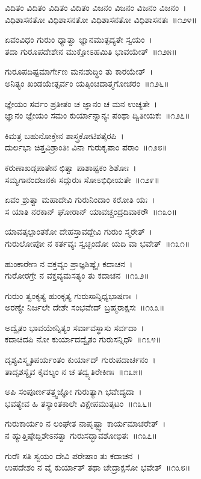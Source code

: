 ವಿದಿತಂ ವಿದಿತಂ ವಿದಿತಂ ವಿದಿತಂ ವಿಜನಂ ವಿಜನಂ ವಿಜನಂ ವಿಜನಂ~।\\
ವಿಧಿಶಾಸನತೋ ವಿಧಿಶಾಸನತೋ ವಿಧಿಶಾಸನತೋ ವಿಧಿಶಾಸನತಃ~॥೧೨೪॥

ಏವಂವಿಧಂ ಗುರುಂ ಧ್ಯಾತ್ವಾ ಜ್ಞಾನಮುತ್ಪದ್ಯತೇ ಸ್ವಯಂ~।\\
ತದಾ ಗುರೂಪದೇಶೇನ ಮುಕ್ತೋಽಹಮಿತಿ ಭಾವಯೇತ್~॥೧೨೫॥

ಗುರೂಪದಿಷ್ಟಮಾರ್ಗೇಣ ಮನಃಶುದ್ಧಿಂ ತು ಕಾರಯೇತ್~।\\
ಅನಿತ್ಯಂ ಖಂಡಯೇತ್ಸರ್ವಂ ಯತ್ಕಿಂಚಿದಾತ್ಮಗೋಚರಂ~॥೧೨೬॥

ಜ್ಞೇಯಂ ಸರ್ವಂ ಪ್ರತೀತಂ ಚ ಜ್ಞಾನಂ ಚ ಮನ ಉಚ್ಯತೇ~।\\
ಜ್ಞಾನಂ ಜ್ಞೇಯಂ ಸಮಂ ಕುರ್ಯಾನ್ನಾನ್ಯಃ ಪಂಥಾ ದ್ವಿತೀಯಕಃ~॥೧೨೭॥

ಕಿಮತ್ರ ಬಹುನೋಕ್ತೇನ ಶಾಸ್ತ್ರಕೋಟಿಶತೈರಪಿ~।\\
ದುರ್ಲಭಾ ಚಿತ್ತವಿಶ್ರಾಂತಿಃ ವಿನಾ ಗುರುಕೃಪಾಂ ಪರಾಂ~॥೧೨೮॥

ಕರುಣಾಖಡ್ಗಪಾತೇನ ಛಿತ್ವಾ ಪಾಶಾಷ್ಟಕಂ ಶಿಶೋಃ~।\\
ಸಮ್ಯಗಾನಂದಜನಕಃ ಸದ್ಗುರುಃ ಸೋಽಭಿಧೀಯತೇ~॥೧೨೯॥

ಏವಂ ಶ್ರುತ್ವಾ ಮಹಾದೇವಿ ಗುರುನಿಂದಾಂ ಕರೋತಿ ಯಃ~।\\
ಸ ಯಾತಿ ನರಕಾನ್ ಘೋರಾನ್ ಯಾವಚ್ಚಂದ್ರದಿವಾಕರೌ~॥೧೩೦॥

ಯಾವತ್ಕಲ್ಪಾಂತಕೋ ದೇಹಸ್ತಾವದ್ದೇವಿ ಗುರುಂ ಸ್ಮರೇತ್~।\\
ಗುರುಲೋಪೋ ನ ಕರ್ತವ್ಯಃ ಸ್ವಚ್ಛಂದೋ ಯದಿ ವಾ ಭವೇತ್~॥೧೩೧॥

ಹುಂಕಾರೇಣ ನ ವಕ್ತವ್ಯಂ ಪ್ರಾಜ್ಞಶಿಷ್ಯೈಃ ಕದಾಚನ~।\\
ಗುರೋರಗ್ರೇ ನ ವಕ್ತವ್ಯಮಸತ್ಯಂ ತು ಕದಾಚನ~॥೧೩೨॥

ಗುರುಂ ತ್ವಂಕೃತ್ಯ ಹುಂಕೃತ್ಯ ಗುರುಸಾನ್ನಿಧ್ಯಭಾಷಣಃ~।\\
ಅರಣ್ಯೇ ನಿರ್ಜಲೇ ದೇಶೇ ಸಂಭವೇದ್ ಬ್ರಹ್ಮರಾಕ್ಷಸಃ~॥೧೩೩॥

ಅದ್ವೈತಂ ಭಾವಯೇನ್ನಿತ್ಯಂ ಸರ್ವಾವಸ್ಥಾಸು ಸರ್ವದಾ~।\\
ಕದಾಚಿದಪಿ ನೋ ಕುರ್ಯಾದದ್ವೈತಂ ಗುರುಸನ್ನಿಧೌ~॥೧೩೪॥

ದೃಶ್ಯವಿಸ್ಮೃತಿಪರ್ಯಂತಂ ಕುರ್ಯಾದ್ ಗುರುಪದಾರ್ಚನಂ~।\\
ತಾದೃಶಸ್ಯೈವ ಕೈವಲ್ಯಂ ನ ಚ ತದ್ವ್ಯತಿರೇಕಿಣಃ~॥೧೩೫॥

ಅಪಿ ಸಂಪೂರ್ಣತತ್ತ್ವಜ್ಞೋ ಗುರುತ್ಯಾಗಿ ಭವೇದ್ಯದಾ~।\\
ಭವತ್ಯೇವ ಹಿ ತಸ್ಯಾಂತಕಾಲೇ ವಿಕ್ಷೇಪಮುತ್ಕಟಂ~॥೧೩೬॥

ಗುರುಕಾರ್ಯಂ ನ ಲಂಘೇತ ನಾಪೃಷ್ಟ್ವಾ ಕಾರ್ಯಮಾಚರೇತ್~।\\
ನ ಹ್ಯುತ್ತಿಷ್ಠೇದ್ದಿಶೇಽನತ್ವಾ ಗುರುಸದ್ಭಾವಶೋಭಿತಃ~॥೧೩೭॥

ಗುರೌ ಸತಿ ಸ್ವಯಂ ದೇವಿ ಪರೇಷಾಂ ತು ಕದಾಚನ~।\\
ಉಪದೇಶಂ ನ ವೈ ಕುರ್ಯಾತ್ ತಥಾ ಚೇದ್ರಾಕ್ಷಸೋ ಭವೇತ್~॥೧೩೮॥

